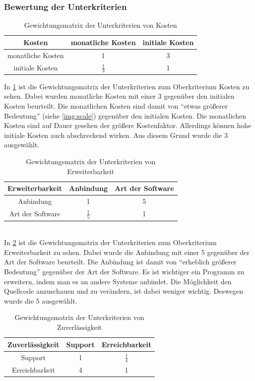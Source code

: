 \subsubsection{Bewertung der Unterkriterien}
\begin{table}[h!]
		\centering
	\begin{tabular}{c|cc}
		Kosten            & monatliche Kosten & initiale Kosten  \\ 
		\hline
		monatliche Kosten & 1                &          3        \\
		initiale Kosten   &     $\frac{1}{3}$           & 1               
	\end{tabular}
	\caption{Gewichtungsmatrix der Unterkriterien von Kosten}
	\label{cost}
\end{table}
In \ref{cost} ist die Gewichtungsmatrix der Unterkriterien zum Oberkriterium  Kosten zu sehen. Dabei wurden monatliche Kosten mit einer 3 gegenüber den initialen Kosten beurteilt. Die monatlichen Kosten sind damit von \enquote{etwas größerer Bedeutung} (siehe \ref{img:scale}) gegenüber den initialen Kosten. Die monatlichen Kosten sind auf Dauer gesehen der größere Kostenfaktor. Allerdings können hohe initiale Kosten auch abschreckend wirken. Aus diesem Grund wurde die 3 ausgewählt.
\begin{table}[h!]
	\centering
	\begin{tabular}{c|cc}
		Erweiterbarkeit  & Anbindung & Art der Software  \\ 
		\hline
		Anbindung        & 1         &        5           \\
		Art der Software &    $\frac{1}{5}$       & 1                
	\end{tabular}
	\caption{Gewichtungsmatrix der Unterkriterien von Erweiterbarkeit}
	\label{extend}
\end{table}\\
In \ref{extend} ist die Gewichtungsmatrix der Unterkriterien zum Oberkriterium Erweiterbarkeit zu sehen. Dabei wurde die Anbindung mit einer 5 gegenüber der Art der Software beurteilt. Die Anbindung ist damit von \enquote{erheblich größerer Bedeutung} gegenüber der Art der Software. Es ist wichtiger ein Programm zu erweitern, indem man es an andere Systeme anbindet. Die Möglichkeit den Quellcode anzuschauen und zu verändern, ist dabei weniger wichtig. Deswegen wurde die 5 ausgewählt.
\begin{table}[h!]
	\centering
	\begin{tabular}{c|cc}
		Zuverlässigkeit & Support & Erreichbarkeit  \\ 
		\hline
		Support         & 1       &        $\frac{1}{4}$         \\
		Erreichbarkeit  &    4     & 1              
	\end{tabular}
	\caption{Gewichtungsmatrix der Unterkriterien von Zuverlässigkeit}
	\label{avail}
\end{table}\\
